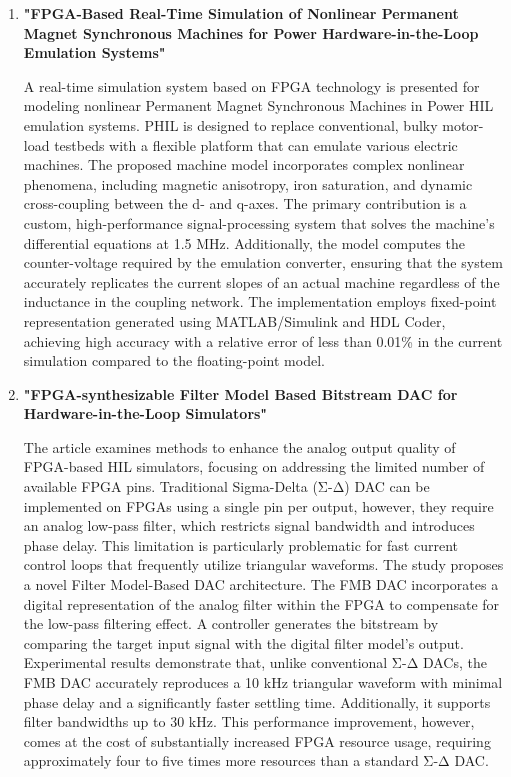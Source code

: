 \begin{enumerate}
	\item \textbf{"\acs{FPGA}-Based Real-Time Simulation of Nonlinear Permanent Magnet Synchronous Machines for Power Hardware-in-the-Loop Emulation Systems"} \cite{Schmitt2014_LiteratureSurvey}
	
	A real-time simulation system based on \acs{FPGA} technology is presented for modeling nonlinear Permanent Magnet Synchronous Machines in Power \acs{HIL} emulation systems. PHIL is designed to replace conventional, bulky motor-load testbeds with a flexible platform that can emulate various electric machines. The proposed machine model incorporates complex nonlinear phenomena, including magnetic anisotropy, iron saturation, and dynamic cross-coupling between the d- and q-axes. The primary contribution is a custom, high-performance signal-processing system that solves the machine’s differential equations at 1.5 MHz. Additionally, the model computes the counter-voltage required by the emulation converter, ensuring that the system accurately replicates the current slopes of an actual machine regardless of the inductance in the coupling network. The implementation employs fixed-point representation generated using MATLAB/Simulink and HDL Coder, achieving high accuracy with a relative error of less than 0.01\% in the current simulation compared to the floating-point model.

	\item \textbf{"\acs{FPGA}-synthesizable Filter Model Based Bitstream \acs{DAC} for Hardware-in-the-Loop Simulators"} \cite{Kokenyesi2016_BitstreamDAC_LiteratureSurvey}

	The article examines methods to enhance the analog output quality of \acs{FPGA}-based \acs{HIL} simulators, focusing on addressing the limited number of available \acs{FPGA} pins. Traditional Sigma-Delta (Σ-Δ) \acs{DAC} can be implemented on \acs{FPGA}s using a single pin per output, however, they require an analog low-pass filter, which restricts signal bandwidth and introduces phase delay. This limitation is particularly problematic for fast current control loops that frequently utilize triangular waveforms. The study proposes a novel Filter Model-Based \acs{DAC} architecture. The FMB \acs{DAC} incorporates a digital representation of the analog filter within the \acs{FPGA} to compensate for the low-pass filtering effect. A controller generates the bitstream by comparing the target input signal with the digital filter model's output. Experimental results demonstrate that, unlike conventional Σ-Δ DACs, the FMB \acs{DAC} accurately reproduces a 10 kHz triangular waveform with minimal phase delay and a significantly faster settling time. Additionally, it supports filter bandwidths up to 30 kHz. This performance improvement, however, comes at the cost of substantially increased \acs{FPGA} resource usage, requiring approximately four to five times more resources than a standard Σ-Δ \acs{DAC}.
		
\end{enumerate}

